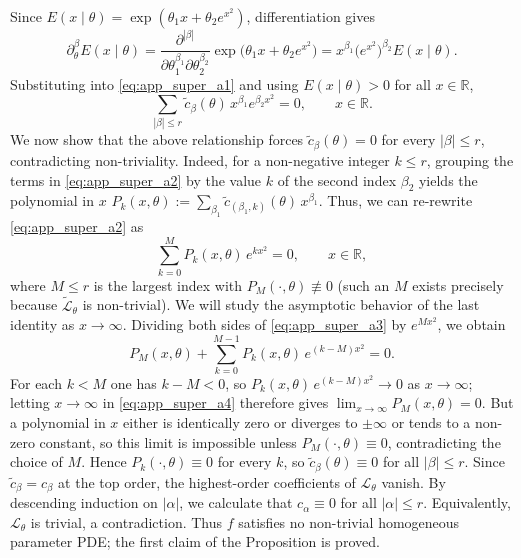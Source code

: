 \documentclass[11pt,twoside]{article} %
\begin{document}
Since $E(x\mid\theta)=\exp(\theta_1x+\theta_2e^{x^2})$, differentiation gives
\begin{equation*}
    \partial^\beta_\theta E(x\mid\theta)
    =\frac{\partial^{|\beta|}}{\partial\theta_1^{\beta_1}\partial\theta_2^{\beta_2}}
    \exp\big(\theta_1x+\theta_2e^{x^2}\big)
    =x^{\beta_1}\big(e^{x^2}\big)^{\beta_2}E(x\mid\theta).
\end{equation*}
Substituting into \eqref{eq:app_super_a1} and using $E(x\mid\theta)>0$ for all $x\in\mathbb R$,
\begin{equation}
    \sum_{|\beta|\le r}\tilde c_\beta(\theta)\,x^{\beta_1}e^{\beta_2x^2}=0,
    \qquad x\in\mathbb R .
    \label{eq:app_super_a2}
\end{equation}
We now show that the above relationship forces $\tilde c_\beta(\theta)=0$ for every $|\beta|\le r$, contradicting
non-triviality. Indeed, for a non-negative integer $k \leq r$, grouping the terms in \eqref{eq:app_super_a2} by the value $k$  of the second index $\beta_2$ yields the polynomial in $x$ $P_k(x,\theta):=\sum_{\beta_1}\tilde c_{(\beta_1,k)}(\theta)\,x^{\beta_1}$. Thus, we can 
re-rewrite \eqref{eq:app_super_a2} as
\begin{equation}
    \sum_{k=0}^{M}P_k(x,\theta)\,e^{kx^2}=0,\qquad x\in\mathbb R,
    \label{eq:app_super_a3}
\end{equation}
where $M\le r$ is the largest index with $P_M(\cdot,\theta)\not\equiv0$ (such an $M$ exists precisely because
$\tilde{\mathcal L}_\theta$ is non-trivial). 
We will study the asymptotic behavior of the last identity as $x \to \infty$. Dividing both sides of \eqref{eq:app_super_a3} by $e^{Mx^2}$, we obtain
\begin{equation}
    P_M(x,\theta)+\sum_{k=0}^{M-1}P_k(x,\theta)\,e^{(k-M)x^2}=0 .
    \label{eq:app_super_a4}
\end{equation}
For each $k<M$ one has $k-M<0$, so $P_k(x,\theta)\,e^{(k-M)x^2}\to0$ as $x\to\infty$; letting $x\to\infty$ in
\eqref{eq:app_super_a4} therefore gives $\lim_{x\to\infty}P_M(x,\theta)=0$. But a polynomial in $x$ either is
identically zero or diverges to $\pm\infty$ or tends to a non-zero constant, so this limit is impossible
unless $P_M(\cdot,\theta)\equiv0$, contradicting the choice of $M$. Hence $P_k(\cdot,\theta)\equiv0$ for every
$k$, so $\tilde c_\beta(\theta)\equiv0$ for all $|\beta|\le r$. Since $\tilde c_\beta=c_\beta$ at the top order,
the highest-order coefficients of $\mathcal L_\theta$ vanish. By descending induction on $|\alpha|$, we calculate that 
$c_\alpha\equiv0$ for all $|\alpha|\le r$. Equivalently, $\mathcal L_\theta$ is trivial, a contradiction. Thus
$f$ satisfies no non-trivial homogeneous parameter PDE; the first claim of the Proposition is proved.
\end{document}
